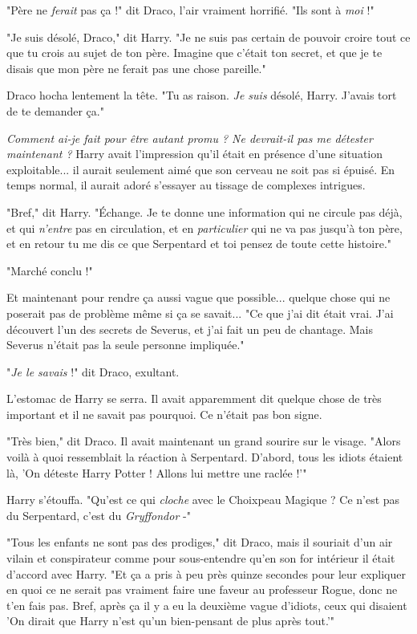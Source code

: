 "Père ne \emph{ferait}  pas ça !" dit Draco, l'air vraiment horrifié. "Ils sont à \emph{moi}  !"

"Je suis désolé, Draco," dit Harry. "Je ne suis pas certain de pouvoir croire tout ce que tu crois au sujet de ton père. Imagine que c'était ton secret, et que je te disais que mon père ne ferait pas une chose pareille."

Draco hocha lentement la tête. "Tu as raison. \emph{Je suis}  désolé, Harry. J'avais tort de te demander ça."

\emph{Comment ai-je fait pour être autant promu ? Ne devrait-il pas me détester maintenant ?}  Harry avait l'impression qu'il était en présence d'une situation exploitable... il aurait seulement aimé que son cerveau ne soit pas si épuisé. En temps normal, il aurait adoré s'essayer au tissage de complexes intrigues.

"Bref," dit Harry. "Échange. Je te donne une information qui ne circule pas déjà, et qui \emph{n'entre}  pas en circulation, et en \emph{particulier}  qui ne va pas jusqu'à ton père, et en retour tu me dis ce que Serpentard et toi pensez de toute cette histoire."

"Marché conclu !"

Et maintenant pour rendre ça aussi vague que possible... quelque chose qui ne poserait pas de problème même si ça se savait... "Ce que j'ai dit était vrai. J'ai découvert l'un des secrets de Severus, et j'ai fait un peu de chantage. Mais Severus n'était pas la seule personne impliquée."

"\emph{Je le savais}  !" dit Draco, exultant.

L'estomac de Harry se serra. Il avait apparemment dit quelque chose de très important et il ne savait pas pourquoi. Ce n'était pas bon signe.

"Très bien," dit Draco. Il avait maintenant un grand sourire sur le visage. "Alors voilà à quoi ressemblait la réaction à Serpentard. D'abord, tous les idiots étaient là, 'On déteste Harry Potter ! Allons lui mettre une raclée !'"

Harry s'étouffa. "Qu'est ce qui \emph{cloche}  avec le Choixpeau Magique ? Ce n'est pas du Serpentard, c'est du \emph{Gryffondor}  -"

"Tous les enfants ne sont pas des prodiges," dit Draco, mais il souriait d'un air vilain et conspirateur comme pour sous-entendre qu'en son for intérieur il était d'accord avec Harry. "Et ça a pris à peu près quinze secondes pour leur expliquer en quoi ce ne serait pas vraiment faire une faveur au professeur Rogue, donc ne t'en fais pas. Bref, après ça il y a eu la deuxième vague d'idiots, ceux qui disaient 'On dirait que Harry n'est qu'un bien-pensant de plus après tout.'"

